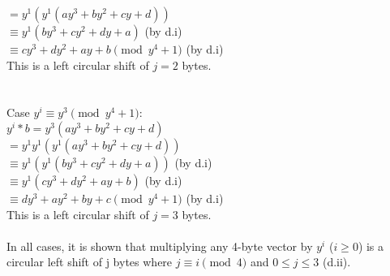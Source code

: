 \documentclass{assignment}
\newcommand\tab[1][0.5cm]{\hspace*{#1}}
\begin{document}
\begin{problemlist}
\begin{problem}
\begin{answer}
\tab$=y^1(y^1(ay^3+by^2+cy+d))$  \\
\tab$\equiv y^1(by^3+cy^2+dy+a)$ \tab (by d.i)\\
\tab$\equiv cy^3+dy^2+ay+b \pmod {y^4+1}$ (by d.i) \\
\tab This is a left circular shift of $j=2$ bytes.\\
\\
\\
Case $y^i\equiv y^3 \pmod {y^4+1}$: \\
\tab$y^i*b=y^3(ay^3+by^2+cy+d)$\\
\tab$=y^1y^1(y^1(ay^3+by^2+cy+d))$  \\
\tab$\equiv y^1(y^1(by^3+cy^2+dy+a))$ \tab (by d.i)\\
\tab$\equiv y^1(cy^3+dy^2+ay+b) $ \tab\tab (by d.i)\\
\tab$\equiv dy^3+ay^2+by+c \pmod {y^4+1}$  (by d.i)\\
\tab This is a left circular shift of $j=3$ bytes.\\
\\
In all cases, it is shown that multiplying any 4-byte vector by $y^i$ ($i\geq 0$) is a circular left shift of j bytes where $j\equiv i \pmod 4$ and $0\leq j \leq 3$ (d.ii).\\
\\
\end{answer}
\end{problem}


\end{problemlist}
\end{document}
